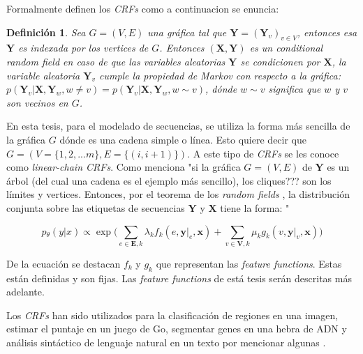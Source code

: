 \documentclass[letterpaper,12pt,oneside]{book}
\newtheorem{definition}{Definición}
\begin{document}
Formalmente \citet{lafferty2001conditional} definen los \textit{CRFs} como a continuacion se enuncia:

\begin{definition}
	Sea $G = (V,E)$ una gráfica tal que $\mathbf{Y} = (\mathbf{Y}_{v})_{v \in V}$, entonces esa $\mathbf{Y}$ es indexada por los vertices de $G$. Entonces $(\mathbf{X}, \mathbf{Y})$ es un \textsf{conditional random field} en caso de que las variables aleatorias $\mathbf{Y}$ se condicionen por $\mathbf{X}$, la variable aleatoria $\mathbf{Y}_{v}$ cumple la \textit{propiedad de Markov} con respecto a la gráfica: $p(\mathbf{Y}_{v}|\mathbf{X},\mathbf{Y}_{w},w \ne v) = p(\mathbf{Y}_{v}|\mathbf{X},\mathbf{Y}_{w},w \sim v)$, dónde $w \sim v$ significa que $w$ y $v$ son vecinos en $G$.
\end{definition}

En esta tesis, para el modelado de secuencias, se utiliza la forma más sencilla de la gráfica $G$ dónde es una cadena simple o línea. Esto quiere decir que $G = (V = \{1,2,...m\}, E = \{(i,i+1)\})$. A este tipo de \textit{CRFs} se les conoce como \textit{linear-chain CRFs}. Como menciona \citet{lafferty2001conditional} "si la gráfica $G = (V,E)$ de $\mathbf{Y}$ es un árbol (del cual una cadena es el ejemplo más sencillo), los cliques??? son los límites y vertices. Entonces, por el teorema de los \textit{random fields} \citep{hammersley1971markov}, la distribución conjunta sobre las etiquetas de secuencias $\mathbf{Y}$ y $\mathbf{X}$ tiene la forma: "


\begin{equation}
	p{_{\theta}}(y|x) \propto \exp \bigg( \sum\limits_{e \in \mathbf{E},k} \lambda_{k}f_{k}(e,\mathbf{y}|_{e},\mathbf{x}) + \sum\limits_{v \in \mathbf{V},k}\mu_{k}g_{k}(v,\mathbf{y}|_{v},\mathbf{x}) \bigg)
\end{equation}



De la ecuación  se destacan $f_{k}$ y $g_{k}$ que representan las \textit{feature functions}. Estas están definidas y son fijas. Las \textit{feature functions} de está tesis serán descritas más adelante. %
 

Los \textit{CRFs} han sido utilizados para la clasificación de regiones en una imagen, estimar el puntaje en un juego de Go, segmentar genes en una hebra de ADN y análisis sintáctico de lenguaje natural en un texto por mencionar algunas \citep{sutton2012introduction}.
\end{document}
